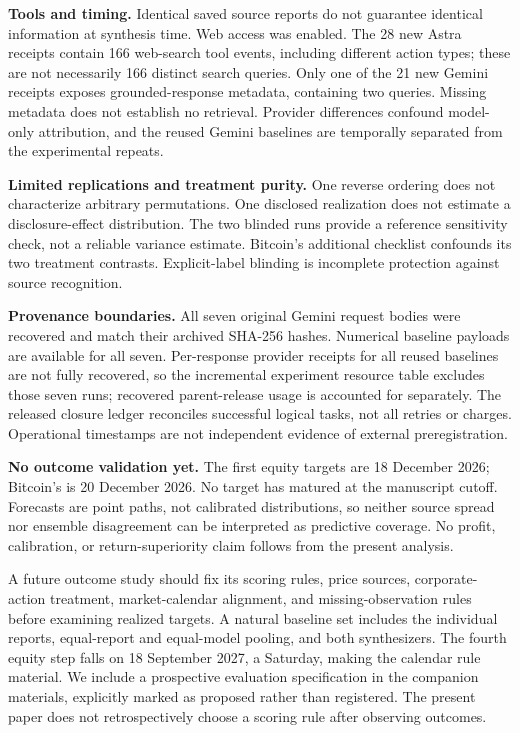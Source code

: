 \documentclass[11pt]{article}
\begin{document}
\textbf{Tools and timing.} Identical saved source reports do not guarantee identical information at synthesis time. Web access was enabled. The 28 new Astra receipts contain 166 web-search tool events, including different action types; these are not necessarily 166 distinct search queries. Only one of the 21 new Gemini receipts exposes grounded-response metadata, containing two queries. Missing metadata does not establish no retrieval. Provider differences confound model-only attribution, and the reused Gemini baselines are temporally separated from the experimental repeats.

\textbf{Limited replications and treatment purity.} One reverse ordering does not characterize arbitrary permutations. One disclosed realization does not estimate a disclosure-effect distribution. The two blinded runs provide a reference sensitivity check, not a reliable variance estimate. Bitcoin's additional checklist confounds its two treatment contrasts. Explicit-label blinding is incomplete protection against source recognition.

\textbf{Provenance boundaries.} All seven original Gemini request bodies were recovered and match their archived SHA-256 hashes. Numerical baseline payloads are available for all seven. Per-response provider receipts for all reused baselines are not fully recovered, so the incremental experiment resource table excludes those seven runs; recovered parent-release usage is accounted for separately. The released closure ledger reconciles successful logical tasks, not all retries or charges. Operational timestamps are not independent evidence of external preregistration.

\textbf{No outcome validation yet.} The first equity targets are 18 December 2026; Bitcoin's is 20 December 2026. No target has matured at the manuscript cutoff. Forecasts are point paths, not calibrated distributions, so neither source spread nor ensemble disagreement can be interpreted as predictive coverage. No profit, calibration, or return-superiority claim follows from the present analysis.

A future outcome study should fix its scoring rules, price sources, corporate-action treatment, market-calendar alignment, and missing-observation rules before examining realized targets. A natural baseline set includes the individual reports, equal-report and equal-model pooling, and both synthesizers. The fourth equity step falls on 18 September 2027, a Saturday, making the calendar rule material. We include a prospective evaluation specification in the companion materials, explicitly marked as proposed rather than registered. The present paper does not retrospectively choose a scoring rule after observing outcomes.
\end{document}
